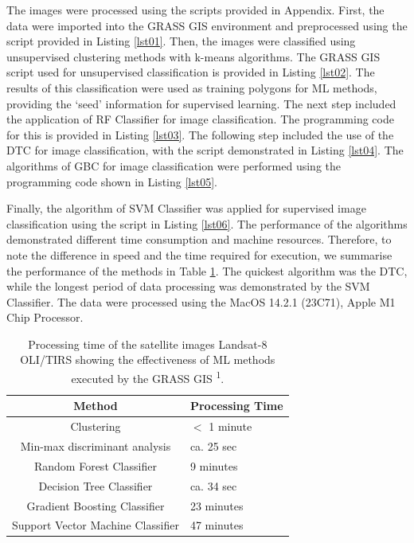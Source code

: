 \documentclass[12pt,a4paper,oneside]{article}
\def \newpar{\vspace{6pt}}
\begin{document}
\newpar The images were processed using the scripts provided in Appendix. First, the data were imported into the GRASS GIS environment and preprocessed using the script provided in Listing \ref{lst01}. Then, the images were classified using unsupervised clustering methods with k-means algorithms. The GRASS GIS script used for unsupervised classification is provided in Listing \ref{lst02}. The results of this classification were used as training polygons for ML methods, providing the ‘seed’ information for supervised learning. The next step included the application of RF Classifier for image classification. The programming code for this is provided in Listing \ref{lst03}. The following step included the use of the DTC for image classification, with the script demonstrated in Listing \ref{lst04}. The algorithms of GBC for image classification were performed using the programming code shown in Listing \ref{lst05}. 

\newpar Finally, the algorithm of SVM Classifier was applied for supervised image classification using the script in Listing \ref{lst06}. The performance of the algorithms demonstrated different time consumption and machine resources. Therefore, to note the difference in speed and the time required for execution, we summarise the performance of the methods in Table \ref{tab2}. The quickest algorithm was the DTC, while the longest period of data processing was demonstrated by the SVM Classifier. The data were processed using the MacOS 14.2.1 (23C71), Apple M1 Chip Processor.

\begin{table}[H]
\small
\caption{Processing time of the satellite images Landsat-8 OLI/TIRS showing the effectiveness of ML methods executed by the GRASS GIS \textsuperscript{1}.\label{tab2}}
\begin{tabularx}{\textwidth}{cp{4cm}}
			\toprule
			\textbf{Method} & \textbf{Processing Time} \\
			\midrule
			Clustering & $<$ 1 minute \\
			Min-max discriminant analysis & ca. 25 sec \\
			Random Forest Classifier & 9 minutes  \\
			Decision Tree Classifier & ca. 34 sec \\
			Gradient Boosting Classifier & 23 minutes  \\
			Support Vector Machine Classifier & 47 minutes  \\
			\bottomrule
\end{tabularx}
\end{table}
\end{document}
